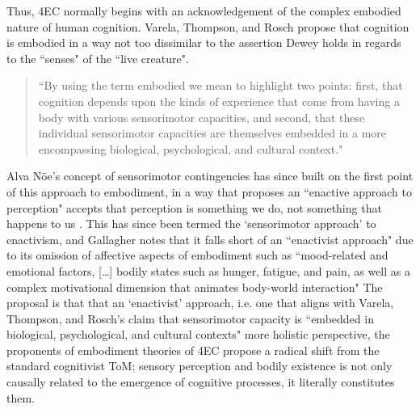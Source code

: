 Thus, 4EC normally begins with an acknowledgement of the complex embodied nature of human cognition. Varela, Thompson, and Rosch propose that cognition is embodied in a way not too dissimilar to the assertion Dewey holds in regards to the ``senses" of the ``live creature".
\begin{quote}
    ``By using the term embodied we mean to highlight two points: first, that cognition depends upon the kinds of experience that come from having a body with various sensorimotor capacities, and second, that these individual sensorimotor capacities are themselves embedded in a more encompassing biological, psychological, and cultural context." \citeyearpar[pp. 172-173]{varela1993}
\end{quote}
Alva Nöe's concept of sensorimotor contingencies has since built on the first point of this approach to embodiment, in a way that proposes an ``enactive approach to perception" accepts that perception is something we do, not something that happens to us \citep{noe2004}. This has since been termed the `sensorimotor approach' to enactivism, and Gallagher notes that it falls short of an ``enactivist approach" due to its omission of affective aspects of embodiment such as ``mood-related and emotional factors, […] bodily states such as hunger, fatigue, and pain, as well as a complex motivational dimension that animates body-world interaction"  \citep[p. 150]{gallagher2017} The proposal is that that an `enactivist' approach, i.e. one that aligns with Varela, Thompson, and Rosch's claim that sensorimotor capacity is ``embedded in biological, psychological, and cultural contexts" more holistic perspective, the proponents of embodiment theories of 4EC propose a radical shift from the standard cognitivist ToM; sensory perception and bodily existence is not only causally related to the emergence of cognitive processes, it literally constitutes them. 

